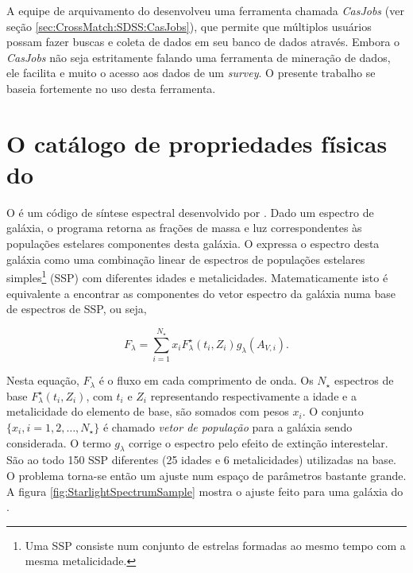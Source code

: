 A equipe de arquivamento do \SDSS desenvolveu uma ferramenta chamada {\em
CasJobs} (ver seção \ref{sec:CrossMatch:SDSS:CasJobs}), que permite que
múltiplos usuários possam fazer buscas e coleta de dados em seu banco de dados
através. Embora o {\em CasJobs} não seja estritamente falando uma ferramenta de
mineração de dados, ele facilita e muito o acesso aos dados de um {\em survey}.
O presente trabalho se baseia fortemente no uso desta ferramenta.



\section{O catálogo de propriedades físicas do \STARLIGHT}
\label{sec:Intro:Starlight}

O \starlight é um código de síntese espectral desenvolvido por
\citet{CidFernandes2005}. Dado um espectro de galáxia, o programa retorna as
frações de massa e luz correspondentes às populações estelares componentes desta
galáxia. O \starlight expressa o espectro desta galáxia como uma combinação
linear de espectros de populações estelares simples\footnote{Uma SSP consiste
num conjunto de estrelas formadas ao mesmo tempo com a mesma metalicidade.}
(SSP) com diferentes idades e metalicidades. Matematicamente isto é equivalente
a encontrar as componentes do vetor espectro da galáxia numa base de espectros
de SSP, ou seja,

\begin{equation*}
F_\lambda = \sum_{i=1}^{N_\star} x_i F^\star_\lambda(t_i,Z_i)
g_\lambda(A_{V,i}).
\end{equation*}

Nesta equação, $F_\lambda$ é o fluxo em cada comprimento de onda. Os $N_\star$
espectros de base $F^\star_\lambda(t_i, Z_i)$, com $t_i$ e $Z_i$ representando
respectivamente a idade e a metalicidade do elemento de base, são somados com
pesos $x_i$. O conjunto $\{x_i, i=1,2,\ldots,N_\star\}$ é chamado {\em vetor de
população} para a galáxia sendo considerada. O termo $g_\lambda$ corrige o
espectro pelo efeito de extinção interestelar. São ao todo 150 SSP diferentes
(25 idades e 6 metalicidades) utilizadas na base. O problema torna-se então um
ajuste num espaço de parâmetros bastante grande. A figura
\ref{fig:StarlightSpectrumSample} mostra o ajuste feito para uma galáxia do
\SDSS.

